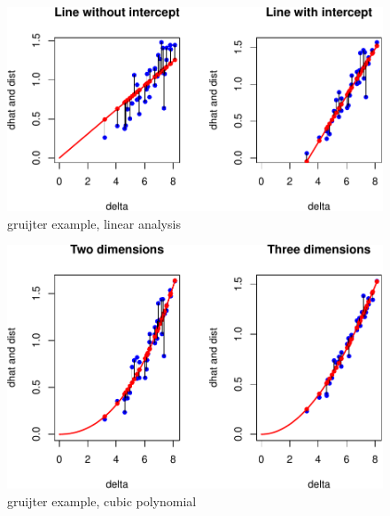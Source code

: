 \documentclass[
  12pt,
]{article}
\begin{document}
\begin{figure}

{\centering \includegraphics{smacofBS_files/figure-latex/gruijterlinear-1} 

}

\caption{gruijter example, linear analysis}\label{fig:gruijterlinear}
\end{figure}

\begin{figure}

{\centering \includegraphics{smacofBS_files/figure-latex/gruijtercubic-1} 

}

\caption{gruijter example, cubic polynomial}\label{fig:gruijtercubic}
\end{figure}
\end{document}
